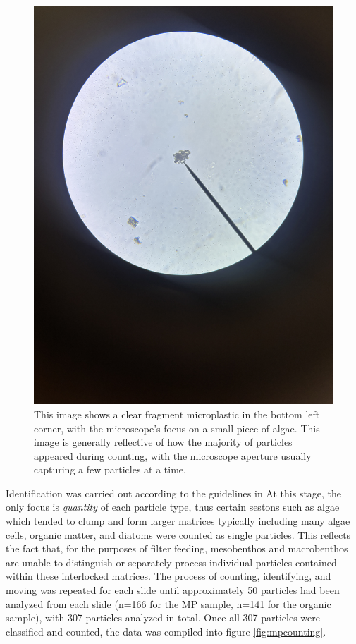 \documentclass[fleqn,10pt]{SelfArx} %
\begin{document}
	
	\begin{figure}[h]
		\centering
		\includegraphics[width=1\linewidth]{Figures/MPOrganic}
		\caption[MP Near Organic Matter]{This image shows a clear fragment microplastic in the bottom left corner, with the microscope's focus on a small piece of algae. This image is generally reflective of how the majority of particles appeared during counting, with the microscope aperture usually capturing a few particles at a time.}
		\label{fig:mporganic}
	\end{figure}
	Identification was carried out according to the guidelines in \cite{Huang_Hu_Wang_2022} At this stage, the only focus is \emph{quantity} of each particle type, thus certain \glspl{seston} such as algae which tended to clump and form larger matrices typically including many algae cells, organic matter, and diatoms were counted as single particles. This reflects the fact that, for the purposes of filter feeding, mesobenthos and macrobenthos are unable to distinguish or separately process individual particles contained within these interlocked matrices. The process of counting, identifying, and moving was repeated for each slide until approximately 50 particles had been analyzed from each slide (n=166 for the MP sample, n=141 for the organic sample), with 307 particles analyzed in total. Once all 307 particles were classified and counted, the data was compiled into figure \ref{fig:mpcounting}.
\end{document}
